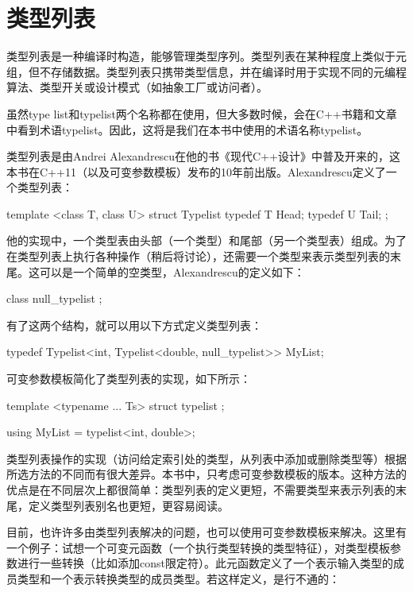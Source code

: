 \section{类型列表}

类型列表是一种编译时构造，能够管理类型序列。类型列表在某种程度上类似于元组，但不存储数据。类型列表只携带类型信息，并在编译时用于实现不同的元编程算法、类型开关或设计模式（如抽象工厂或访问者）。

\begin{important}
虽然type list和typelist两个名称都在使用，但大多数时候，会在C++书籍和文章中看到术语typelist。因此，这将是我们在本书中使用的术语名称typelist。
\end{important}

类型列表是由Andrei Alexandrescu在他的书《现代C++设计》中普及开来的，这本书在C++11（以及可变参数模板）发布的10年前出版。Alexandrescu定义了一个类型列表：

\begin{cppcode}
template <class T, class U>
struct Typelist
{
	typedef T Head;
	typedef U Tail;
};
\end{cppcode}

他的实现中，一个类型表由头部（一个类型）和尾部（另一个类型表）组成。为了在类型列表上执行各种操作（稍后将讨论），还需要一个类型来表示类型列表的末尾。这可以是一个简单的空类型，Alexandrescu的定义如下：

\begin{cppcode}
class null_typelist {};
\end{cppcode}

有了这两个结构，就可以用以下方式定义类型列表：

\begin{cppcode}
typedef Typelist<int,
				 Typelist<double, null_typelist>> MyList;
\end{cppcode}

可变参数模板简化了类型列表的实现，如下所示：

\begin{cppcode}
template <typename ... Ts>
struct typelist {};

using MyList = typelist<int, double>;
\end{cppcode}

类型列表操作的实现（访问给定索引处的类型，从列表中添加或删除类型等）根据所选方法的不同而有很大差异。本书中，只考虑可变参数模板的版本。这种方法的优点是在不同层次上都很简单：类型列表的定义更短，不需要类型来表示列表的末尾，定义类型列表别名也更短，更容易阅读。

目前，也许许多由类型列表解决的问题，也可以使用可变参数模板来解决。这里有一个例子：试想一个可变元函数（一个执行类型转换的类型特征），对类型模板参数进行一些转换（比如添加const限定符）。此元函数定义了一个表示输入类型的成员类型和一个表示转换类型的成员类型。若这样定义，是行不通的：

